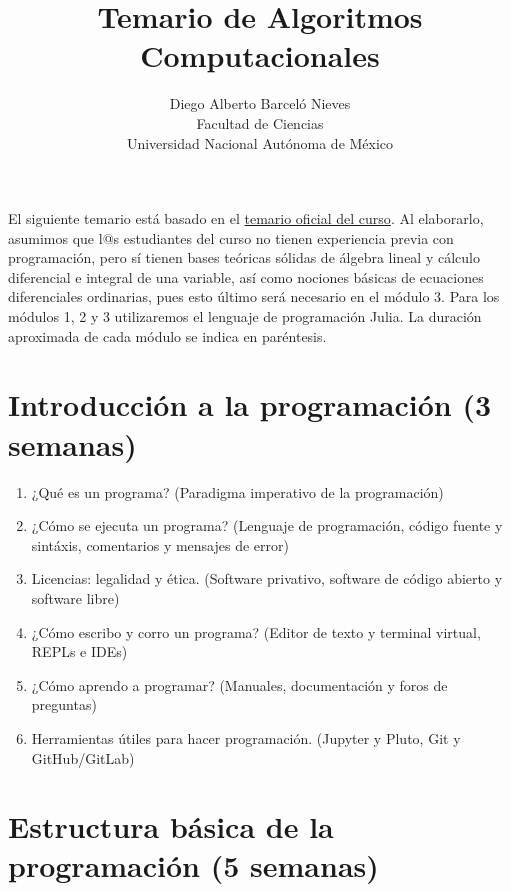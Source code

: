 \documentclass[a4paper]{article}
\begin{document}
\title{Temario de Algoritmos Computacionales}
\author{Diego Alberto Barceló Nieves \\ Facultad de Ciencias \\ Universidad Nacional Autónoma de México}
\date{}
\maketitle

El siguiente temario está basado en el \href{https://www.fciencias.unam.mx/estudiar-en-ciencias/estudios/licenciaturas/asignaturas/2016/1430}{temario oficial del curso}. Al elaborarlo, asumimos que l@s estudiantes del curso no tienen experiencia previa con programación, pero sí tienen bases teóricas sólidas de álgebra lineal y cálculo diferencial e integral de una variable, así como nociones básicas de ecuaciones diferenciales ordinarias, pues esto último será necesario en el módulo 3. Para los módulos 1, 2 y 3 utilizaremos el lenguaje de programación Julia. La duración aproximada de cada módulo se indica en paréntesis.

\setcounter{section}{-1}

\section{Introducción a la programación (3 semanas)} \label{Sec: Introducción a la programación (2 semanas)} 

\begin{enumerate}[label=\arabic*.]

    \item ¿Qué es un programa? (Paradigma imperativo de la programación)

    \item ¿Cómo se ejecuta un programa? (Lenguaje de programación, código fuente y sintáxis, comentarios y mensajes de error)
    \item Licencias: legalidad y ética. (Software privativo, software de código abierto y software libre)
    \item ¿Cómo escribo y corro un programa? (Editor de texto y terminal virtual, REPLs e IDEs)
    \item ¿Cómo aprendo a programar? (Manuales, documentación y foros de preguntas)
    \item Herramientas útiles para hacer programación. (Jupyter y Pluto, Git y GitHub/GitLab)
\end{enumerate}

\section{Estructura básica de la programación (5 semanas)} \label{Sec: Estructura básica de la programación (3 semanas)}
\end{document}
